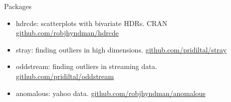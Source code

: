 \documentclass[14pt,ignorenonframetext,]{beamer}
\begin{document}
\begin{frame}{Packages}
\protect\hypertarget{packages}{}

\fontsize{14.5}{18}\sf

\begin{itemize}
\item
  \alert{hdrcde}: scatterplots with bivariate HDRs. \newline CRAN
  \textbar{} \url{github.com/robjhyndman/hdrcde}\vspace*{0.4cm}
\item
  \alert{stray}: finding outliers in high dimensions.
  \newline\url{github.com/pridiltal/stray}\vspace*{0.4cm}
\item
  \alert{oddstream}: finding outliers in streaming data.
  \newline\url{github.com/pridiltal/oddstream}\vspace*{0.4cm}
\item
  \alert{anomalous}: yahoo data.
  \newline\url{github.com/robjhyndman/anomalous}
\end{itemize}

\end{frame}
\end{document}
